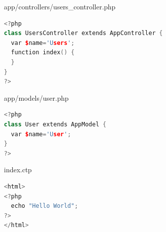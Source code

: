 \begin{frame}[fragile]{app/controllers/users\_controller.php}
\begin{lstlisting}[language=c++]
<?php
class UsersController extends AppController {
  var $name='Users';
  function index() {
  }
}
?>
\end{lstlisting}
\end{frame}

\begin{frame}[fragile]{app/models/user.php}
\begin{lstlisting}[language=c++]
<?php
class User extends AppModel {
  var $name='User';
}
?>
\end{lstlisting}
\end{frame}

\begin{frame}[fragile]{index.ctp}
\begin{lstlisting}[language=c++]
<html>
<?php
  echo "Hello World";
?>
</html>
\end{lstlisting}
\end{frame}



